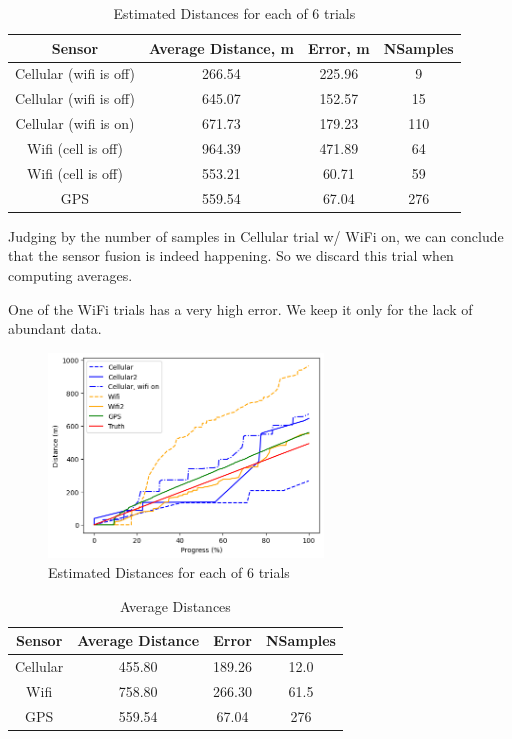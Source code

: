 \documentclass{lab}
\begin{document}
\begin{table}[h!]
    \centering
    \begin{tabular}{|c|c|c|c|}
        \hline
        \textbf{Sensor} & \textbf{Average Distance, m} & \textbf{Error, m} & \textbf{NSamples} \\ \hline
        Cellular (wifi is off) & 266.54 & 225.96 & 9 \\ \hline
        Cellular (wifi is off) & 645.07 & 152.57 & 15 \\ \hline
        Cellular (wifi is on) & 671.73 & 179.23 & 110 \\ \hline
        Wifi (cell is off) & 964.39 & 471.89 & 64 \\ \hline
        Wifi (cell is off) & 553.21 & 60.71 & 59 \\ \hline
        GPS & 559.54 & 67.04 & 276 \\ \hline
    \end{tabular}
    \caption{Estimated Distances for each of 6 trials}
    \label{tab:distances}
\end{table}

Judging by the number of samples in Cellular trial w/ WiFi on, we can conclude that the sensor fusion is indeed happening. So we discard this trial when computing averages.

One of the WiFi trials has a very high error. We keep it only for the lack of abundant data.


\begin{figure}[h]
\begin{center}
\includegraphics[width=0.65\textwidth]{images/distances.png} 
\caption{Estimated Distances for each of 6 trials}
\end{center}  
\end{figure}

\begin{table}[h!]
  \centering
  \begin{tabular}{|c|c|c|c|}
      \hline
      \textbf{Sensor} & \textbf{Average Distance} & \textbf{Error} & \textbf{NSamples} \\ \hline
      Cellular & 455.80 & 189.26 & 12.0 \\ \hline
      Wifi & 758.80 & 266.30 & 61.5 \\ \hline
      GPS & 559.54 & 67.04 & 276 \\ \hline
  \end{tabular}
  \caption{Average Distances}
  \label{tab:averages}
\end{table}
\end{document}
